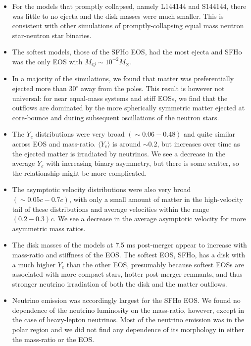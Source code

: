 \begin{itemize}
\item For the models that promptly collapsed, namely L144144 and S144144, there was little to no ejecta and the disk masses were much smaller. 
This is consistent with other simulations of promptly-collapsing equal mass neutron star-neutron star binaries.
\item The softest models, those of the SFHo EOS, had the most ejecta and SFHo was the only EOS with $M_{ej} \sim 10^{-2}M_\odot$. 
\item In a majority of the simulations, we found that matter was preferentially ejected more than $30^\circ$ away from the poles. This result is however not universal: for near equal-mass systems and stiff EOSs, we find that the outflows are dominated by the more spherically symmetric matter ejected at core-bounce and during subsequent oscillations of the neutron stars.
\item The $Y_e$ distributions were very broad $(\sim 0.06 - 0.48)$ and quite similar across EOS and mass-ratio. $\langle Y_e \rangle$ is around $\sim 0.2$, but increases over time as the ejected matter is irradiated by neutrinos. We see a decrease in the average $Y_e$ with increasing binary asymmetry, but there is some scatter, so the relationship might be more complicated.
\item The asymptotic velocity distributions were also very broad $(\sim 0.05c - 0.7c)$, with only a small amount of matter in the high-velocity tail of these distributions and average velocities
within the range $(0.2 - 0.3)c$.
We see a decrease in the average asymptotic velocity for more asymmetric mass ratios.
\item The disk masses of the models at 7.5 ms post-merger appear to increase with mass-ratio and stiffness of the EOS. The softest EOS, SFHo, has a disk with a much higher $Y_e$ than the other EOS, presumably because softest EOSs are associated with more compact stars, hotter post-merger remnants, and thus stronger neutrino irradiation of both the disk and the matter outflows.
\item Neutrino emission was accordingly largest for the SFHo EOS.
We found no dependence of the neutrino luminosity on the mass-ratio, however, except in the case of heavy-lepton neutrinos. Most of the neutrino emission was in the polar region and we did not find any dependence of its morphology in either the mass-ratio or the EOS.
\end{itemize}

